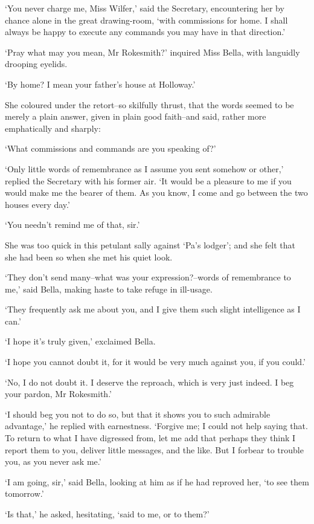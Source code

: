 ‘You never charge me, Miss Wilfer,’ said the Secretary, encountering her
by chance alone in the great drawing-room, ‘with commissions for home.
I shall always be happy to execute any commands you may have in that
direction.’

‘Pray what may you mean, Mr Rokesmith?’ inquired Miss Bella, with
languidly drooping eyelids.

‘By home? I mean your father’s house at Holloway.’

She coloured under the retort--so skilfully thrust, that the words
seemed to be merely a plain answer, given in plain good faith--and said,
rather more emphatically and sharply:

‘What commissions and commands are you speaking of?’

‘Only little words of remembrance as I assume you sent somehow or
other,’ replied the Secretary with his former air. ‘It would be a
pleasure to me if you would make me the bearer of them. As you know, I
come and go between the two houses every day.’

‘You needn’t remind me of that, sir.’

She was too quick in this petulant sally against ‘Pa’s lodger’; and she
felt that she had been so when she met his quiet look.

‘They don’t send many--what was your expression?--words of remembrance
to me,’ said Bella, making haste to take refuge in ill-usage.

‘They frequently ask me about you, and I give them such slight
intelligence as I can.’

‘I hope it’s truly given,’ exclaimed Bella.

‘I hope you cannot doubt it, for it would be very much against you, if
you could.’

‘No, I do not doubt it. I deserve the reproach, which is very just
indeed. I beg your pardon, Mr Rokesmith.’

‘I should beg you not to do so, but that it shows you to such admirable
advantage,’ he replied with earnestness. ‘Forgive me; I could not help
saying that. To return to what I have digressed from, let me add that
perhaps they think I report them to you, deliver little messages, and
the like. But I forbear to trouble you, as you never ask me.’

‘I am going, sir,’ said Bella, looking at him as if he had reproved her,
‘to see them tomorrow.’

‘Is that,’ he asked, hesitating, ‘said to me, or to them?’

